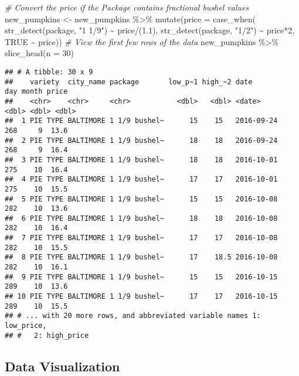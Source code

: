 \documentclass[
]{article}
\newenvironment{Shaded}{\begin{snugshade}}{\end{snugshade}}
\newcommand{\AttributeTok}[1]{\textcolor[rgb]{0.77,0.63,0.00}{#1}}
\newcommand{\CommentTok}[1]{\textcolor[rgb]{0.56,0.35,0.01}{\textit{#1}}}
\newcommand{\ConstantTok}[1]{\textcolor[rgb]{0.00,0.00,0.00}{#1}}
\newcommand{\DecValTok}[1]{\textcolor[rgb]{0.00,0.00,0.81}{#1}}
\newcommand{\FloatTok}[1]{\textcolor[rgb]{0.00,0.00,0.81}{#1}}
\newcommand{\FunctionTok}[1]{\textcolor[rgb]{0.00,0.00,0.00}{#1}}
\newcommand{\NormalTok}[1]{#1}
\newcommand{\OtherTok}[1]{\textcolor[rgb]{0.56,0.35,0.01}{#1}}
\newcommand{\SpecialCharTok}[1]{\textcolor[rgb]{0.00,0.00,0.00}{#1}}
\newcommand{\StringTok}[1]{\textcolor[rgb]{0.31,0.60,0.02}{#1}}
\begin{document}
\begin{Shaded}
\begin{Highlighting}[]
\CommentTok{\# Convert the price if the Package contains fractional bushel values}
\NormalTok{new\_pumpkins }\OtherTok{\textless{}{-}}\NormalTok{ new\_pumpkins }\SpecialCharTok{\%\textgreater{}\%} 
  \FunctionTok{mutate}\NormalTok{(}\AttributeTok{price =} \FunctionTok{case\_when}\NormalTok{(}
    \FunctionTok{str\_detect}\NormalTok{(package, }\StringTok{"1 1/9"}\NormalTok{) }\SpecialCharTok{\textasciitilde{}}\NormalTok{ price}\SpecialCharTok{/}\NormalTok{(}\FloatTok{1.1}\NormalTok{),}
    \FunctionTok{str\_detect}\NormalTok{(package, }\StringTok{"1/2"}\NormalTok{) }\SpecialCharTok{\textasciitilde{}}\NormalTok{ price}\SpecialCharTok{*}\DecValTok{2}\NormalTok{,}
    \ConstantTok{TRUE} \SpecialCharTok{\textasciitilde{}}\NormalTok{ price))}
\CommentTok{\# View the first few rows of the data}
\NormalTok{new\_pumpkins }\SpecialCharTok{\%\textgreater{}\%} 
  \FunctionTok{slice\_head}\NormalTok{(}\AttributeTok{n =} \DecValTok{30}\NormalTok{)}
\end{Highlighting}
\end{Shaded}

\begin{verbatim}
## # A tibble: 30 x 9
##    variety  city_name package       low_p~1 high_~2 date         day month price
##    <chr>    <chr>     <chr>           <dbl>   <dbl> <date>     <dbl> <dbl> <dbl>
##  1 PIE TYPE BALTIMORE 1 1/9 bushel~      15    15   2016-09-24   268     9  13.6
##  2 PIE TYPE BALTIMORE 1 1/9 bushel~      18    18   2016-09-24   268     9  16.4
##  3 PIE TYPE BALTIMORE 1 1/9 bushel~      18    18   2016-10-01   275    10  16.4
##  4 PIE TYPE BALTIMORE 1 1/9 bushel~      17    17   2016-10-01   275    10  15.5
##  5 PIE TYPE BALTIMORE 1 1/9 bushel~      15    15   2016-10-08   282    10  13.6
##  6 PIE TYPE BALTIMORE 1 1/9 bushel~      18    18   2016-10-08   282    10  16.4
##  7 PIE TYPE BALTIMORE 1 1/9 bushel~      17    17   2016-10-08   282    10  15.5
##  8 PIE TYPE BALTIMORE 1 1/9 bushel~      17    18.5 2016-10-08   282    10  16.1
##  9 PIE TYPE BALTIMORE 1 1/9 bushel~      15    15   2016-10-15   289    10  13.6
## 10 PIE TYPE BALTIMORE 1 1/9 bushel~      17    17   2016-10-15   289    10  15.5
## # ... with 20 more rows, and abbreviated variable names 1: low_price,
## #   2: high_price
\end{verbatim}

\hypertarget{data-visualization}{%
\subsection{Data Visualization}\label{data-visualization}}
\end{document}
